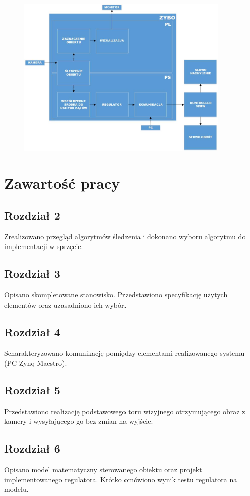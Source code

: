 \begin{figure}[h]
	\centering
	\includegraphics[width=4in]{scheme_pol.jpg}
\end{figure}

\section{Zawartość pracy}
\label{sec:zawartoscpracy}

\subsection{Rozdział 2}
Zrealizowano przegląd algorytmów śledzenia i dokonano wyboru algorytmu do implementacji w sprzęcie.

\subsection{Rozdział 3}
Opisano skompletowane stanowisko. Przedstawiono specyfikację użytych elementów oraz uzasadniono ich wybór.

\subsection{Rozdział 4}
Scharakteryzowano komunikację pomiędzy elementami realizowanego systemu (PC-Zynq-Maestro).

\subsection{Rozdział 5}
Przedstawiono realizację podstawowego toru wizyjnego otrzymującego obraz z kamery i wysyłającego go bez zmian na wyjście.

\subsection{Rozdział 6}
Opisano model matematyczny sterowanego obiektu oraz projekt implementowanego regulatora. Krótko omówiono wynik testu regulatora na modelu.